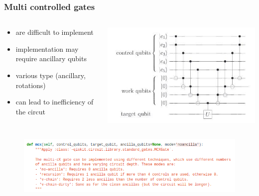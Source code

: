 \documentclass{beamer}
\begin{document}
\begin{frame}
    \frametitle{Multi controlled gates}
    \begin{columns}
        \begin{column}{.5\textwidth}
            \begin{itemize}
                \item \small are difficult to implement
                \item \small implementation may require ancillary qubits
                \item \small various type (ancillary, rotations)
                \item \small can lead to inefficiency of the circut
            \end{itemize}
        \end{column}
        \begin{column}{.5\textwidth}
            \includegraphics[scale=0.4]{img/ancillary.jpg}
        \centering
        \end{column}
    \end{columns}

    \begin{figure}[h!]
        \includegraphics[scale=0.5]{img/mcx.png}
        \centering
    \end{figure}
\end{frame}
\end{document}
